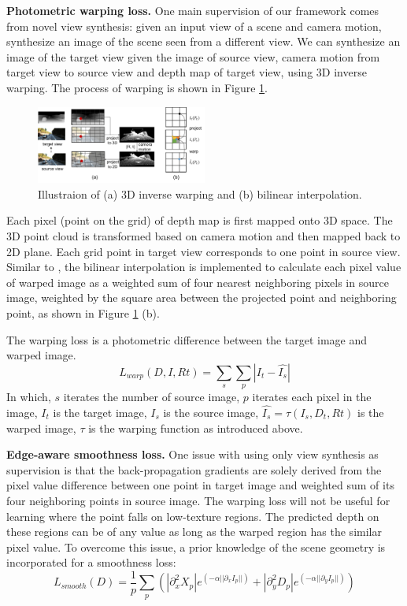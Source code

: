 \textbf{Photometric warping loss.} One main supervision of our framework comes from novel view synthesis: given an input view of a scene and camera motion, synthesize an image of the scene seen from a different view. We can synthesize an image of the target view given the image of source view, camera motion from target view to source view and depth map of target view, using 3D inverse warping. The process of warping is shown in Figure \ref{fig:3d_warping}.
\begin{figure}
\centering
\includegraphics[width=0.5\textwidth]{figures/3d_warping.pdf}
\caption{Illustraion of (a) 3D inverse warping and (b) bilinear interpolation.}
\label{fig:3d_warping}
\end{figure}
Each pixel (point on the grid) of depth map is first mapped onto 3D space. The 3D point cloud is transformed based on camera motion and then mapped back to 2D plane. Each grid point in target view corresponds to one point in source view. Similar to \cite{jaderberg2015spatial}, the bilinear interpolation is implemented to calculate each pixel value of warped image as a weighted sum of four nearest neighboring pixels in source image, weighted by the square area between the projected point and neighboring point, as shown in Figure \ref{fig:3d_warping} (b).

The warping loss is a photometric difference between the target image and warped image. $$L_{warp}(D, I, Rt) = \sum_s\sum_p|I_t - \hat{I_s}|$$
In which, $s$ iterates the number of source image, $p$ iterates each pixel in the image, $I_t$ is the target image, $I_s$ is the source image, $\hat{I_s} = \tau(I_s, D_t, Rt)$ is the warped image, $\tau$ is the warping function as introduced above.

\textbf{Edge-aware smoothness loss.} One issue with using only view synthesis as supervision is that the back-propagation gradients are solely derived from the pixel value difference between one point in target image and weighted sum of its four neighboring points in source image. The warping loss will not be useful for learning where the point falls on low-texture regions. The predicted depth on these regions can be of any value as long as the warped region has the similar pixel value.  To overcome this issue, a prior knowledge of the scene geometry is incorporated for a smoothness loss:
\small
$$L_{smooth}(D) = \frac{1}{p} \sum_{p}(|\partial^2_xX_p|e^{(-\alpha||\partial_xI_p||)} + |\partial^2_yD_p|e^{(-\alpha||\partial_yI_p||)})$$
\normalsize

